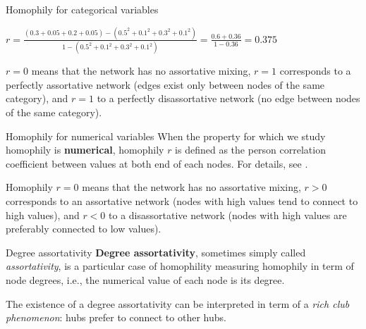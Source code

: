 \begin{textbox}{Homophily for categorical variables}
\vspace{0.3cm}

$r=\frac{(0.3+0.05+0.2+0.05)-(0.5^2+0.1^2+0.3^2+0.1^2)}{1-(0.5^2+0.1^2+0.3^2+0.1^2)}=\frac{0.6+0.36}{1-0.36}=0.375$

\vspace{0.3cm}

$r=0$ means that the network has no assortative mixing, $r=1$ corresponds to a perfectly assortative network (edges exist only between nodes of the same category), and $r=1$ to a perfectly disassortative network (no edge between nodes of the same category).
\end{textbox}











\begin{textbox}{Homophily for numerical variables}
When the property for which we study homophily is \textbf{numerical}, homophily $r$ is defined as the person correlation coefficient between values at both end of each nodes. For details, see \cite{newman2003mixing}.

\vspace{0.3cm}


Homophily $r=0$ means that the network has no assortative mixing, $r>0$ corresponds to an assortative network (nodes with high values tend to connect to high values), and $r<0$ to a disassortative network (nodes with high values are preferably connected to low values).

\end{textbox}













\begin{textbox}{Degree assortativity}
\textbf{Degree assortativity}, sometimes simply called \textit{assortativity}, is a particular case of homophility measuring homophily in term of node degrees, i.e., the numerical value of each node is its degree.

The existence of a degree assortativity can be interpreted in term of a \textit{rich club phenomenon}: hubs prefer to connect to other hubs.

\end{textbox}



